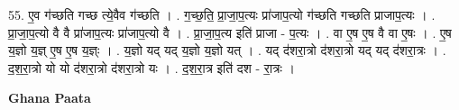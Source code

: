 \documentclass[17pt]{extarticle}
\begin{document}
55. ए॒व ग॑च्छति गच्छ त्ये॒वैव ग॑च्छति । . ग॒च्छ॒ति॒ प्रा॒जा॒प॒त्यः प्रा॑जाप॒त्यो ग॑च्छति गच्छति प्राजाप॒त्यः । . प्रा॒जा॒प॒त्यो वै वै प्रा॑जाप॒त्यः प्रा॑जाप॒त्यो वै । . प्रा॒जा॒प॒त्य इति॑ प्राजा - प॒त्यः । . वा ए॒ष ए॒ष वै वा ए॒षः । . ए॒ष य॒ज्ञो य॒ज्ञ् ए॒ष ए॒ष य॒ज्ञ्ः । . य॒ज्ञो यद् यद् य॒ज्ञो य॒ज्ञो यत् । . यद् द॑शरा॒त्रो द॑शरा॒त्रो यद् यद् द॑शरा॒त्रः । . द॒श॒रा॒त्रो यो यो द॑शरा॒त्रो द॑शरा॒त्रो यः । . द॒श॒रा॒त्र इति॑ दश - रा॒त्रः । \newline

\textbf{Ghana Paata } \newline
\end{document}
